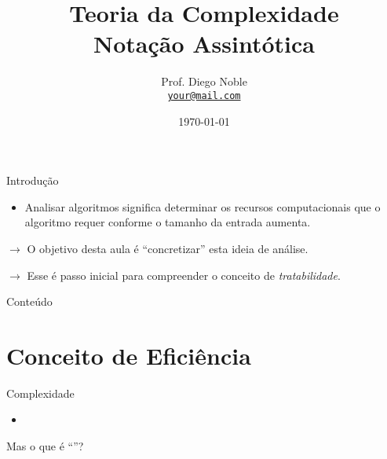 \documentclass[
    mode=present,
    style=dvn,
    paper=screen,
    display=slidesnotes,
    size=14pt,
]{powerdot}
\title{Teoria da Complexidade \\
    \small Notação Assintótica\\}
\author{\smallskip Prof. Diego Noble \\%
\texttt{\href{mailto:your@mail.com}{\color{pdcolor4}your@mail.com}}}%
\date{\today}
\theoremstyle{plain}
\theoremstyle{definition}
\theoremstyle{remark}
\begin{document}
\maketitle

\begin{slide}{Introdução}
    \begin{itemize}
        \item Analisar algoritmos significa determinar os recursos computacionais que
        o algoritmo requer conforme o tamanho da entrada aumenta.
    \end{itemize}
    \bigskip
    
    $\rightarrow$ O objetivo desta aula é ``concretizar'' esta ideia de análise.\pause

    $\rightarrow$ Esse é passo inicial para compreender o conceito de \textit{tratabilidade}.
\end{slide}


\begin{slide}{Conteúdo}
    \Large
    \tableofcontents[content=sections]
\end{slide}
\section{Conceito de Eficiência}
\begin{slide}{Complexidade}
    \Large
    \begin{itemize}
    \item {}
    \end{itemize}
    Mas o que é ``''?
\end{slide}
\end{document}
